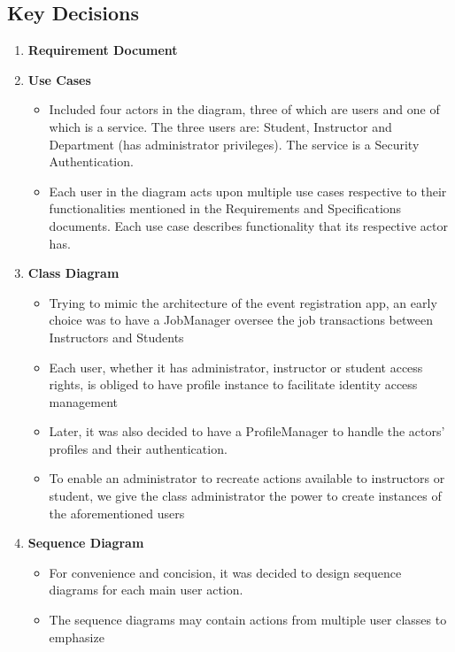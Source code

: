 \documentclass[12pt]{article}
\begin{document}
\subsection{Key Decisions}


\begin{enumerate}
    \item \textbf{Requirement Document}
    \item \textbf{Use Cases}
    \begin{itemize}
        \item Included four actors in the diagram, three of which are users and one of which is a service. The three users are: Student, Instructor and Department (has administrator privileges). The service is a Security Authentication.
        \item Each user in the diagram acts upon multiple use cases respective to their functionalities mentioned in the Requirements and Specifications documents. Each use case describes functionality that its respective actor has.
    \end{itemize}
    \item \textbf{Class Diagram}
    \begin{itemize}
        \item Trying to mimic the architecture of the event registration app, an early choice was to have a JobManager oversee the job transactions between Instructors and Students
        \item Each user, whether it has administrator, instructor or student access rights, is obliged to have profile instance to facilitate identity access management
        \item Later, it was also decided to have a ProfileManager to handle the actors' profiles and
            their authentication.
        \item To enable an administrator to recreate actions available to instructors or student, we give the class administrator the power to create instances of the aforementioned users
    \end{itemize}
    \item \textbf{Sequence Diagram}
        \begin{itemize}
            \item For convenience and concision, it was decided to design sequence diagrams for each
                main user action.
            \item The sequence diagrams may contain actions from multiple user classes to emphasize

\end{itemize}
\end{enumerate}
\end{document}
